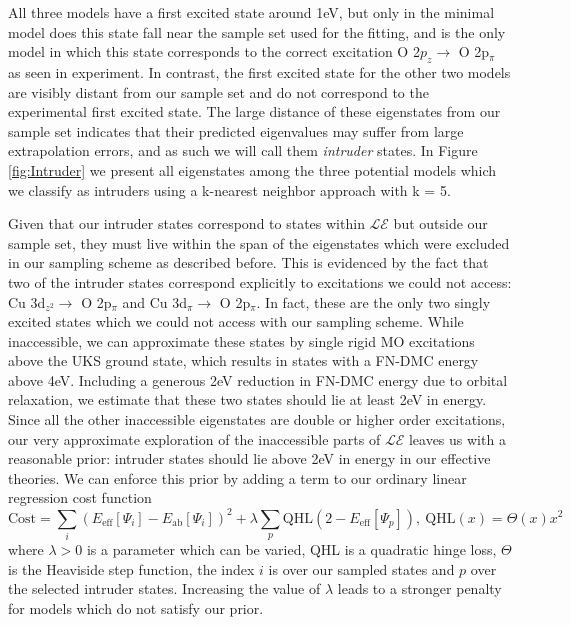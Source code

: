 \documentclass{article}
\begin{document}
All three models have a first excited state around 1eV, but only in the minimal model does this state fall near the sample set used for the fitting, and is the only model in which this state corresponds to the correct excitation O 2$p_z \rightarrow $ O 2p$_\pi$ as seen in experiment.
In contrast, the first excited state for the other two models are visibly distant from our sample set and do not correspond to the experimental first excited state.
The large distance of these eigenstates from our sample set indicates that their predicted eigenvalues may suffer from large extrapolation errors, and as such we will call them \textit{intruder} states.
In Figure \ref{fig:Intruder} we present all eigenstates among the three potential models which we classify as intruders using a k-nearest neighbor approach with k = 5.

Given that our intruder states correspond to states within $\mathcal{LE}$ but outside our sample set, they must live within the span of the eigenstates which were excluded in our sampling scheme as described before.
This is evidenced by the fact that two of the intruder states correspond explicitly to excitations we could not access: Cu 3d$_{z^2} \rightarrow $ O 2p$_\pi$ and  Cu 3d$_\pi \rightarrow $ O 2p$_\pi$.
In fact, these are the only two singly excited states which we could not access with our sampling scheme.
While inaccessible, we can approximate these states by single rigid MO excitations above the UKS ground state, which results in states with a FN-DMC energy above 4eV.
Including a generous 2eV reduction in FN-DMC energy due to orbital relaxation, we estimate that these two states should lie at least 2eV in energy. 
Since all the other inaccessible eigenstates are double or higher order excitations, our very approximate exploration of the inaccessible parts of $\mathcal{LE}$ leaves us with a reasonable prior: intruder states should lie above 2eV in energy in our effective theories.
We can enforce this prior by adding a term to our ordinary linear regression cost function
\begin{equation}
\text{Cost} = \sum_{i} (E_\text{eff}[\Psi_i] - E_\text{ab}[\Psi_i])^2 + \lambda \sum_{p}\text{QHL}(2 - E_\text{eff}[\Psi_p]),\ \text{QHL}(x) = \Theta(x)x^2
\label{eq:cost}
\end{equation}
where $\lambda>0$ is a parameter which can be varied, QHL is a quadratic hinge loss, $\Theta$ is the Heaviside step function, the index $i$ is over our sampled states and $p$ over the selected intruder states.
Increasing the value of $\lambda$ leads to a stronger penalty for models which do not satisfy our prior.
\end{document}
